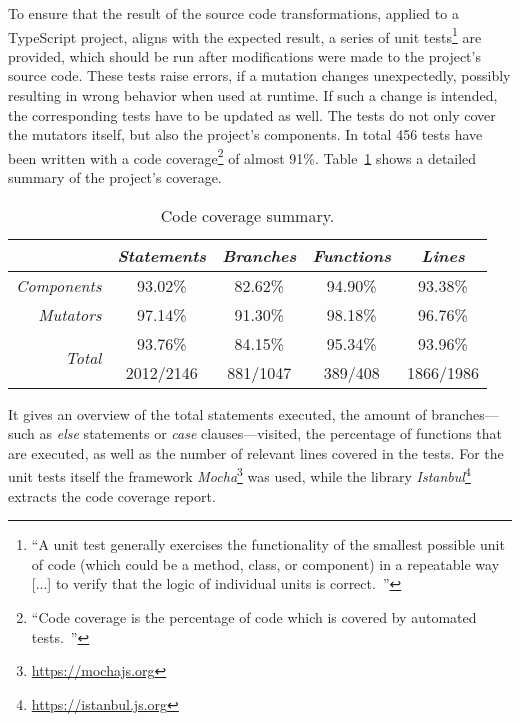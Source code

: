 To ensure that the result of the source code transformations, applied to a TypeScript project, aligns with the expected result, a series of unit tests\footnote{``A unit test generally exercises the functionality of the smallest possible unit of code (which could be a method, class, or component) in a repeatable way~\cite{UnitTests:Android} [...] to verify that the logic of individual units is correct.~\cite{UnitTests:Android}''} are provided, which should be run after modifications were made to the project's source code. These tests raise errors, if a mutation changes unexpectedly, possibly resulting in wrong behavior when used at runtime. If such a change is intended, the corresponding tests have to be updated as well. The tests do not only cover the mutators itself, but also the project's components. In total 456 tests have been written with a code coverage\footnote{``Code coverage is the percentage of code which is covered by automated tests.~\cite{CodeCoverage:Atlassian}''} of almost 91\%. Table~\ref{tab:code-coverage} shows a detailed summary of the project's coverage.
\begin{table}
\caption{Code coverage summary.}
\label{tab:code-coverage}
\centering
\setlength{\tabcolsep}{5mm}
\def\arraystretch{1.25}
\small
\begin{tabular}{|r||c|c|c|c|}
    \hline
    & \emph{Statements} & \emph{Branches} & \emph{Functions} & \emph{Lines} \\
    \hline
    \hline
    \emph{Components} & 93.02\% & 82.62\% & 94.90\% & 93.38\% \\
    \hline
    \emph{Mutators} & 97.14\% & 91.30\% & 98.18\% & 96.76\% \\
    \hline
    \hline
    \multicolumn{1}{|r||}{\multirow{2}{*}{\emph{Total}}} & 93.76\% & 84.15\% & 95.34\% & 93.96\% \\
    \cline{2-5}
    \multicolumn{1}{|c||}{} & 2012/2146 & 881/1047 & 389/408 & 1866/1986 \\
    \hline
  \end{tabular}
\end{table}
It gives an overview of the total statements executed, the amount of branches---such as \emph{else} statements or \emph{case} clauses---visited, the percentage of functions that are executed, as well as the number of relevant lines covered in the tests. For the unit tests itself the framework \emph{Mocha}\footnote{\url{https://mochajs.org}} was used, while the library \emph{Istanbul}\footnote{\url{https://istanbul.js.org}} extracts the code coverage report.

